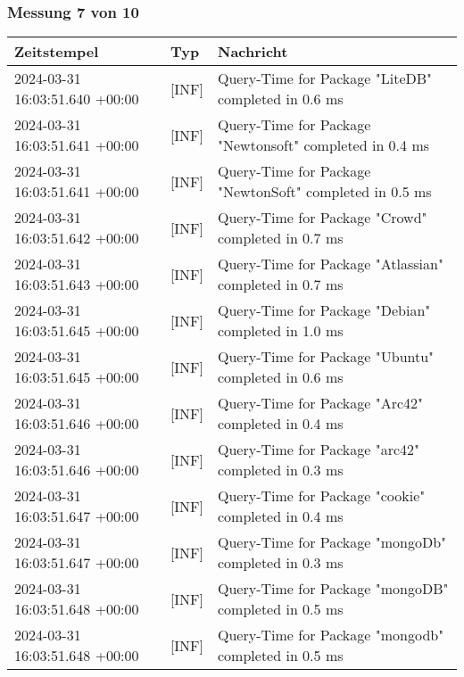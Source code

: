     \subsubsection{Messung 7 von 10} \label{subsubsec:MySQLMitIndex7von10}
        {
            {\small
                \begin{tabularx}{\textwidth}{|l|l|X|}
                    \hline
                    \textbf{Zeitstempel} & \textbf{Typ} & \textbf{Nachricht} \\
                    \hline
                    \endhead
                    2024-03-31 16:03:51.640 +00:00 & [INF] & Query-Time for Package "LiteDB" completed in 0.6 ms \\
                    2024-03-31 16:03:51.641 +00:00 & [INF] & Query-Time for Package "Newtonsoft" completed in 0.4 ms \\
                    2024-03-31 16:03:51.641 +00:00 & [INF] & Query-Time for Package "NewtonSoft" completed in 0.5 ms \\
                    2024-03-31 16:03:51.642 +00:00 & [INF] & Query-Time for Package "Crowd" completed in 0.7 ms \\
                    2024-03-31 16:03:51.643 +00:00 & [INF] & Query-Time for Package "Atlassian" completed in 0.7 ms \\
                    2024-03-31 16:03:51.645 +00:00 & [INF] & Query-Time for Package "Debian" completed in 1.0 ms \\
                    2024-03-31 16:03:51.645 +00:00 & [INF] & Query-Time for Package "Ubuntu" completed in 0.6 ms \\
                    2024-03-31 16:03:51.646 +00:00 & [INF] & Query-Time for Package "Arc42" completed in 0.4 ms \\
                    2024-03-31 16:03:51.646 +00:00 & [INF] & Query-Time for Package "arc42" completed in 0.3 ms \\
                    2024-03-31 16:03:51.647 +00:00 & [INF] & Query-Time for Package "cookie" completed in 0.4 ms \\
                    2024-03-31 16:03:51.647 +00:00 & [INF] & Query-Time for Package "mongoDb" completed in 0.3 ms \\
                    2024-03-31 16:03:51.648 +00:00 & [INF] & Query-Time for Package "mongoDB" completed in 0.5 ms \\
                    2024-03-31 16:03:51.648 +00:00 & [INF] & Query-Time for Package "mongodb" completed in 0.5 ms \\

\end{tabularx}}}
